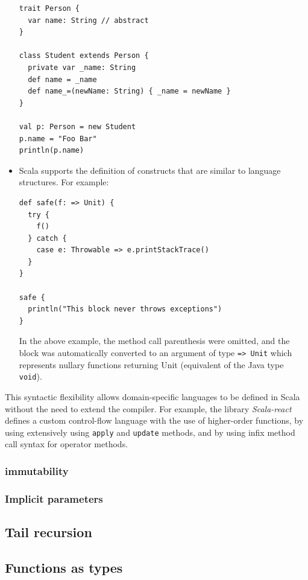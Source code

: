 \begin{itemize}
\begin{lstlisting}
trait Person {
  var name: String // abstract
}

class Student extends Person {
  private var _name: String
  def name = _name
  def name_=(newName: String) { _name = newName }
}

val p: Person = new Student
p.name = "Foo Bar"
println(p.name)
\end{lstlisting}

\item Scala supports the definition of constructs that are similar to language structures. For example:
\begin{lstlisting}
def safe(f: => Unit) {
  try {
    f()
  } catch {
    case e: Throwable => e.printStackTrace()
  }
}

safe {
  println("This block never throws exceptions")
}
\end{lstlisting}

In the above example, the method call parenthesis were omitted, and the block was automatically converted to an argument of type \texttt{=> Unit} which represents nullary functions returning Unit (equivalent of the Java type \texttt{void}).

\end{itemize}

This syntactic flexibility allows domain-specific languages to be defined in Scala without the need to extend the compiler. For example, the library \emph{Scala-react} defines a custom control-flow language with the use of higher-order functions, by using extensively using \texttt{apply} and \texttt{update} methods, and by using infix method call syntax for operator methods.

\subsubsection{immutability}

\subsubsection{Implicit parameters}

\subsection{Tail recursion}

\subsection{Functions as types}
